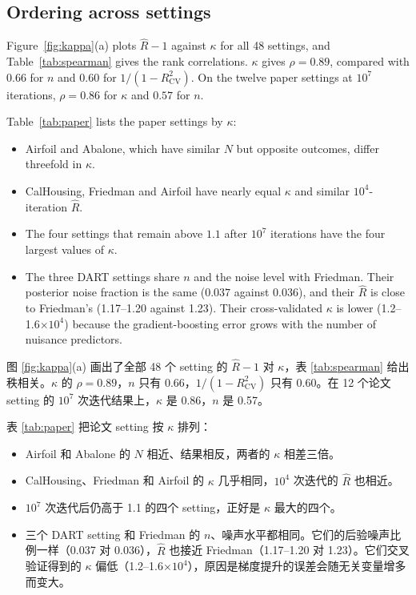 \documentclass[11pt]{article}
\newcommand{\zhfont}{}
\newcommand{\Rhat}{\hat R}
\begin{document}
\subsection{Ordering across settings\quad{\zhfont 跨 setting 的排序}}
Figure~\ref{fig:kappa}(a) plots $\Rhat-1$ against $\kappa$ for all 48 settings, and Table~\ref{tab:spearman} gives the rank correlations. $\kappa$ gives $\rho=0.89$, compared with $0.66$ for $n$ and $0.60$ for $1/(1-R^2_{\mathrm{CV}})$. On the twelve paper settings at $10^7$ iterations, $\rho=0.86$ for $\kappa$ and $0.57$ for $n$.

Table~\ref{tab:paper} lists the paper settings by $\kappa$:
\begin{itemize}
\item Airfoil and Abalone, which have similar $N$ but opposite outcomes, differ threefold in $\kappa$.
\item CalHousing, Friedman and Airfoil have nearly equal $\kappa$ and similar $10^4$-iteration $\Rhat$.
\item The four settings that remain above $1.1$ after $10^7$ iterations have the four largest values of $\kappa$.
\item The three DART settings share $n$ and the noise level with Friedman. Their posterior noise fraction is the same ($0.037$ against $0.036$), and their $\Rhat$ is close to Friedman's (1.17--1.20 against 1.23). Their cross-validated $\kappa$ is lower (1.2--1.6$\times10^4$) because the gradient-boosting error grows with the number of nuisance predictors.
\end{itemize}

\begin{zhbox}
图 \ref{fig:kappa}(a) 画出了全部 48 个 setting 的 $\Rhat-1$ 对 $\kappa$，表 \ref{tab:spearman} 给出秩相关。$\kappa$ 的 $\rho=0.89$，$n$ 只有 0.66，$1/(1-R^2_{\mathrm{CV}})$ 只有 0.60。在 12 个论文 setting 的 $10^7$ 次迭代结果上，$\kappa$ 是 0.86，$n$ 是 0.57。

表 \ref{tab:paper} 把论文 setting 按 $\kappa$ 排列：
\begin{itemize}
\item Airfoil 和 Abalone 的 $N$ 相近、结果相反，两者的 $\kappa$ 相差三倍。
\item CalHousing、Friedman 和 Airfoil 的 $\kappa$ 几乎相同，$10^4$ 次迭代的 $\Rhat$ 也相近。
\item $10^7$ 次迭代后仍高于 1.1 的四个 setting，正好是 $\kappa$ 最大的四个。
\item 三个 DART setting 和 Friedman 的 $n$、噪声水平都相同。它们的后验噪声比例一样（0.037 对 0.036），$\Rhat$ 也接近 Friedman（1.17--1.20 对 1.23）。它们交叉验证得到的 $\kappa$ 偏低（1.2--1.6$\times10^4$），原因是梯度提升的误差会随无关变量增多而变大。
\end{itemize}
\end{zhbox}
\end{document}
